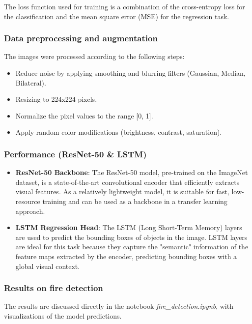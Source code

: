 \documentclass{article}
\begin{document}
The loss function used for training is a combination of the cross-entropy loss for the classification and the mean square error (MSE) for the regression task.

\subsubsection{Data preprocessing and augmentation}

The images were processed according to the following steps:

\begin{itemize}
    \item Reduce noise by applying smoothing and blurring filters (Gaussian, Median, Bilateral).
    \item Resizing to 224x224 pixels.
    \item Normalize the pixel values to the range [0, 1].
    \item Apply random color modifications (brightness, contrast, saturation).
\end{itemize}

\subsubsection{Performance (ResNet-50 \& LSTM)}

\begin{itemize}
    \item \textbf{ResNet-50 Backbone}: The ResNet-50 model, pre-trained on the ImageNet dataset, is a state-of-the-art convolutional encoder that efficiently extracts visual features. As a relatively lightweight model, it is suitable for fast, low-resource training and can be used as a backbone in a transfer learning approach.
    \item \textbf{LSTM Regression Head}: The LSTM (Long Short-Term Memory) layers are used to predict the bounding boxes of objects in the image. LSTM layers are ideal for this task because they capture the "semantic" information of the feature maps extracted by the encoder, predicting bounding boxes with a global visual context.
\end{itemize}

\subsubsection{Results on fire detection}

The results are discussed directly in the notebook \textit{fire\_detection.ipynb}, with visualizations of the model predictions.
\end{document}

